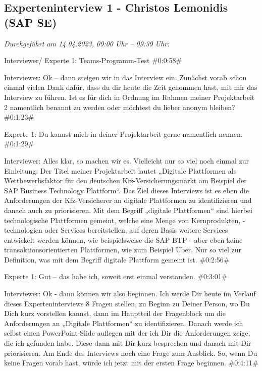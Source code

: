\newpage
\subsection{Experteninterview 1 - Christos Lemonidis (SAP SE)}

\textit{Durchgeführt am 14.04.2023, 09:00 Uhr -- 09:39 Uhr:}


Interviewer/ Experte 1:
Teams-Programm-Test 
\#0:0:58\#

Interviewer:
Ok – dann steigen wir in das Interview ein. Zunächst vorab schon einmal vielen Dank dafür, dass du dir heute die Zeit genommen hast, mit mir das Interview zu führen. Ist es für dich in Ordnung im Rahmen meiner Projektarbeit 2 namentlich benannt zu werden oder möchtest du lieber anonym bleiben?
\#0:1:23\#

Experte 1:
Du kannst mich in deiner Projektarbeit gerne namentlich nennen.
\#0:1:29\#

Interviewer:
Alles klar, so machen wir es. Vielleicht nur so viel noch einmal zur Einleitung: Der Titel meiner Projektarbeit lautet „Digitale Plattformen als Wettbewerbsfaktor für den deutschen Kfz-Versicherungsmarkt am Beispiel der SAP Business Technology Plattform“. Das Ziel dieses Interviews ist es eben die Anforderungen der Kfz-Versicherer an digitale Plattformen zu identifizieren und danach auch zu priorisieren. Mit dem Begriff „digitale Plattformen“ sind hierbei technologische Plattformen gemeint, welche eine Menge von Kernprodukten, -technologien oder Services bereitstellen, auf deren Basis weitere Services entwickelt werden können, wie beispielsweise die SAP BTP - aber eben keine transaktionsorientierten Plattformen, wie zum Beispiel Uber. Nur so viel zur Definition, was mit dem Begriff digitale Plattform gemeint ist.
\#0:2:56\#

Experte 1:
Gut – das habe ich, soweit erst einmal verstanden.
\#0:3:01\#

Interviewer:
Ok - dann können wir also beginnen. Ich werde Dir heute im Verlauf dieses Experteninterviews 8 Fragen stellen, zu Beginn zu Deiner Person, wo Du Dich kurz vorstellen kannst, dann im Hauptteil der Fragenblock um die Anforderungen an „Digitale Plattformen“ zu identifizieren. Danach werde ich selbst einen PowerPoint-Slide auflegen mit der ich Dir die Anforderungen zeige, die ich gefunden habe. Diese dann mit Dir kurz besprechen und danach mit Dir priorisieren. Am Ende des Interviews noch eine Frage zum Ausblick. So, wenn Du keine Fragen vorab hast, würde ich jetzt mit der ersten Frage beginnen.
\#0:4:11\#

